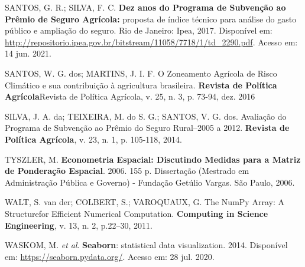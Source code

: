 \documentclass[
	12pt,				%
	openright,			%
	oneside,			%
	a4paper,			%
	chapter=TITLE,		%
	section=TITLE,		%
	english,			%
	french,				%
	spanish,			%
	brazil				%
	]{abntex2}
\begin{document}
\begin{thebibliography}{}
    {SANTOS, G. R.; SILVA, F. C. \textbf{Dez anos do Programa de Subvenção ao Prêmio de Seguro Agrícola:}  proposta  de  índice  técnico  para  análise  do  gasto  público  e  ampliação  do  seguro.  Rio de Janeiro: Ipea, 2017. Disponível em: \url{http://repositorio.ipea.gov.br/bitstream/11058/7718/1/td_2290.pdf}. Acesso em: 14 jun. 2021.}
    
    {SANTOS, W. G. dos; MARTINS, J. I. F. O Zoneamento Agrícola de Risco Climático e sua contribuição à agricultura brasileira. \textbf{Revista de Política Agrícola}{Revista de Política Agrícola}, v. 25, n. 3, p. 73-94, dez. 2016}
    
    {SILVA, J. A. da; TEIXEIRA, M. do S. G.; SANTOS, V. G. dos. Avaliação do Programa de Subvenção ao Prêmio do Seguro Rural–2005 a 2012. \textbf{Revista de Política Agrícola}, v. 23, n. 1, p. 105-118, 2014.}
    
    {TYSZLER, M. \textbf{Econometria Espacial: Discutindo Medidas para a Matriz de Ponderação Espacial}. 2006. 155 p. Dissertação (Mestrado em Administração Pública e Governo) - Fundação Getúlio Vargas. São Paulo, 2006.}
    
    {WALT, S. van der; COLBERT, S.; VAROQUAUX, G. The NumPy Array: A Structurefor Efficient Numerical Computation. \textbf{Computing in Science Engineering}, v. 13, n. 2, p.22–30, 2011.}
    
    {WASKOM, M. \textit{et al}. \textbf{Seaborn}: statistical data visualization. 2014. Disponível em: \url{https://seaborn.pydata.org/}. Acesso em: 28 jul. 2020.}


\end{thebibliography}




%
\end{document}
